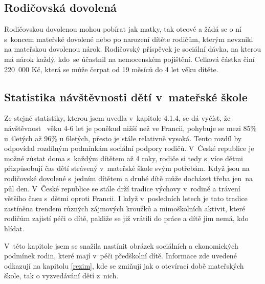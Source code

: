 			\subsection{Rodičovská dovolená}
				Rodičovskou dovolenou mohou pobírat jak matky, tak otcové a žádá se o ní s koncem mateřské dovolené nebo po narození dítěte rodičům, kterým nevznikl na mateřskou dovolenou nárok. Rodičovský příspěvek je sociální dávka, na kterou má nárok každý, kdo se účastnil na nemocenském pojištění. Celková částka činí 220 000 Kč, která se může čerpat od 19 měsíců do 4 let věku dítěte.

			\subsection{Statistika návštěvnosti dětí v mateřské škole}
				Ze stejné statistiky, kterou jsem uvedla v kapitole 4.1.4, se dá vyčíst, že návštěvnost  věku 4-6 let je poněkud nižší než ve Francii, pohybuje se mezi 85\% u 4letých až 96\% u 6letých, přesto je stále relativně vysoká. Tento rozdíl by odpovídal rozdílným podmínkám sociální podpory rodičů. V České republice je možné zůstat doma s každým dítětem až 4 roky, rodiče si tedy s více dětmi přizpůsobují čas dětí strávený v mateřské škole svým potřebám. Když jsou na rodičovské dovolené s jedním dítětem a druhé dítě může docházet třeba jen na půl den. V České republice se stále drží tradice výchovy v rodině a trávení většího času s dětmi oproti Francii. I když v posledních letech je tato tradice zastíněna trendem různých zájmových kroužků a mimoškolních aktivit, které rodičům zajistí péči o dítě, pakliže se již vrátili do práce a dítě jim nemá, kdo hlídat. 
				
				V této kapitole jsem se snažila nastínit obrázek sociálních a ekonomických podmínek rodin, které mají v péči předškolní dítě. Informace zde uvedené odkazují na kapitolu \ref{rezim}, kde se zmiňuji jak o otevírací době mateřských škole, tak o vyzvedávání dětí z nich. 
